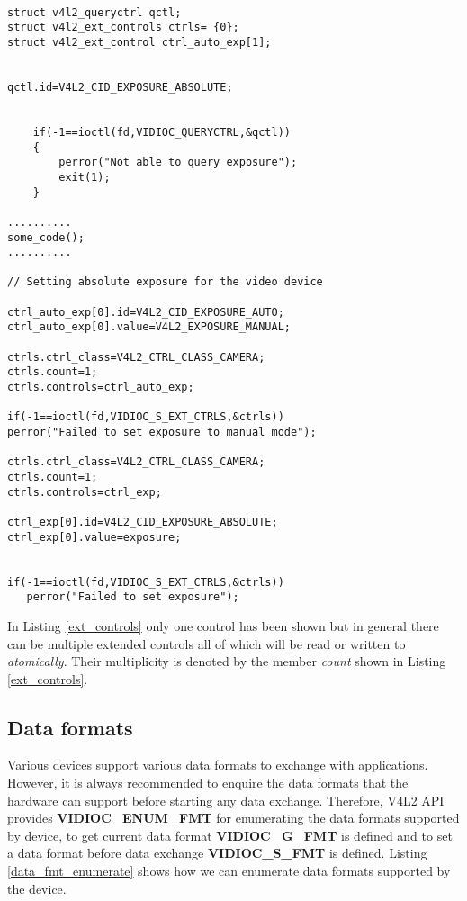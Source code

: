 \documentclass{article}
\begin{document}
\begin{lstlisting}[label=ext_controls,caption=Extended controls]

struct v4l2_queryctrl qctl;
struct v4l2_ext_controls ctrls= {0};
struct v4l2_ext_control ctrl_auto_exp[1];


qctl.id=V4L2_CID_EXPOSURE_ABSOLUTE;


    if(-1==ioctl(fd,VIDIOC_QUERYCTRL,&qctl))
    {
        perror("Not able to query exposure");
        exit(1);
    }

..........
some_code();
..........

// Setting absolute exposure for the video device

ctrl_auto_exp[0].id=V4L2_CID_EXPOSURE_AUTO;
ctrl_auto_exp[0].value=V4L2_EXPOSURE_MANUAL;

ctrls.ctrl_class=V4L2_CTRL_CLASS_CAMERA;
ctrls.count=1;
ctrls.controls=ctrl_auto_exp;

if(-1==ioctl(fd,VIDIOC_S_EXT_CTRLS,&ctrls))
perror("Failed to set exposure to manual mode");

ctrls.ctrl_class=V4L2_CTRL_CLASS_CAMERA;
ctrls.count=1;
ctrls.controls=ctrl_exp;

ctrl_exp[0].id=V4L2_CID_EXPOSURE_ABSOLUTE;
ctrl_exp[0].value=exposure;


if(-1==ioctl(fd,VIDIOC_S_EXT_CTRLS,&ctrls))
   perror("Failed to set exposure");

\end{lstlisting}

In Listing \ref{ext_controls} only one control has been shown but in general there can be multiple extended controls all of which will be read or written to \textit{atomically}. Their multiplicity is denoted by the member \textit{count} shown in Listing \ref{ext_controls}.


\subsection{Data formats}
Various devices support various data formats to exchange with applications. However, it is always recommended to enquire the data formats that the hardware can support before starting any data exchange. Therefore, V4L2 API provides \textbf{VIDIOC\_ENUM\_FMT} for enumerating the data formats supported by device, to get current data format \textbf{VIDIOC\_G\_FMT} is defined and to set a data format before data exchange \textbf{VIDIOC\_S\_FMT} is defined. Listing \ref{data_fmt_enumerate} shows how we can enumerate data formats supported by the device.
\end{document}
